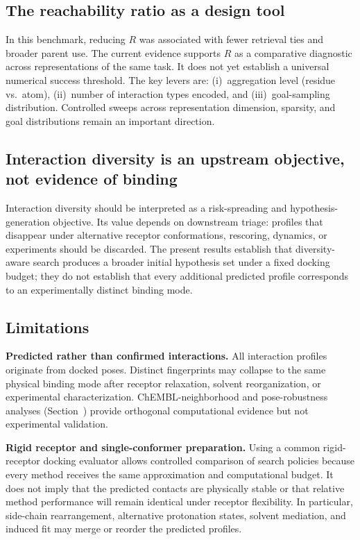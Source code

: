 \documentclass[journal=jcisd8,manuscript=article]{achemso}
\begin{document}
\subsection{The reachability ratio as a design tool}

In this benchmark, reducing $R$ was associated with fewer retrieval ties and broader parent use. The current evidence supports $R$ as a comparative diagnostic across representations of the same task. It does not yet establish a universal numerical success threshold. The key levers are: (i)~aggregation level (residue vs.\ atom), (ii)~number of interaction types encoded, and (iii)~goal-sampling distribution. Controlled sweeps across representation dimension, sparsity, and goal distributions remain an important direction.

\subsection{Interaction diversity is an upstream objective, not evidence of binding}

Interaction diversity should be interpreted as a risk-spreading and hypothesis-generation objective. Its value depends on downstream triage: profiles that disappear under alternative receptor conformations, rescoring, dynamics, or experiments should be discarded. The present results establish that diversity-aware search produces a broader initial hypothesis set under a fixed docking budget; they do not establish that every additional predicted profile corresponds to an experimentally distinct binding mode.

\subsection{Limitations}

\textbf{Predicted rather than confirmed interactions.} All interaction profiles originate from docked poses. Distinct fingerprints may collapse to the same physical binding mode after receptor relaxation, solvent reorganization, or experimental characterization. ChEMBL-neighborhood and pose-robustness analyses (Section~) provide orthogonal computational evidence but not experimental validation.

\textbf{Rigid receptor and single-conformer preparation.} Using a common rigid-receptor docking evaluator allows controlled comparison of search policies because every method receives the same approximation and computational budget. It does not imply that the predicted contacts are physically stable or that relative method performance will remain identical under receptor flexibility. In particular, side-chain rearrangement, alternative protonation states, solvent mediation, and induced fit may merge or reorder the predicted profiles.
\end{document}
